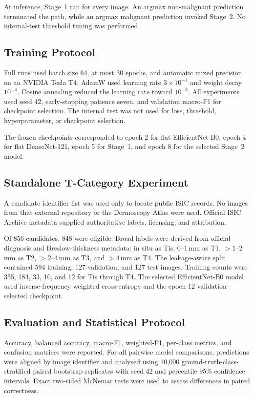 At inference, Stage~1 ran for every image. An argmax non-malignant prediction
terminated the path, while an argmax malignant prediction invoked Stage~2.
No internal-test threshold tuning was performed.

\subsection{Training Protocol}

Full runs used batch size 64, at most 30 epochs, and automatic mixed precision
on an NVIDIA Tesla T4. AdamW used learning rate $3\times10^{-4}$ and weight
decay $10^{-4}$. Cosine annealing reduced the learning rate toward
$10^{-6}$. All experiments used seed 42, early-stopping patience seven, and
validation macro-F1 for checkpoint selection. The internal test was not used
for loss, threshold, hyperparameter, or checkpoint selection.

The frozen checkpoints corresponded to epoch 2 for flat EfficientNet-B0,
epoch 4 for flat DenseNet-121, epoch 5 for Stage~1, and epoch 8 for the
selected Stage~2 model.

\subsection{Standalone T-Category Experiment}

A candidate identifier list was used only to locate public ISIC records. No
images from that external repository or the Dermoscopy Atlas were used.
Official ISIC Archive metadata supplied authoritative labels, licensing, and
attribution.

Of 856 candidates, 848 were eligible. Broad labels were derived from official
diagnosis and Breslow-thickness metadata: in situ as Tis,
$0$--$1$\,mm as T1, $>1$--$2$\,mm as T2,
$>2$--$4$\,mm as T3, and $>4$\,mm as T4. The leakage-aware split contained
594 training, 127 validation, and 127 test images. Training counts were
355, 184, 33, 10, and 12 for Tis through T4. The selected
EfficientNet-B0 model used inverse-frequency weighted cross-entropy and the
epoch-12 validation-selected checkpoint.

\subsection{Evaluation and Statistical Protocol}

Accuracy, balanced accuracy, macro-F1, weighted-F1, per-class metrics, and
confusion matrices were reported. For all pairwise model comparisons, predictions were aligned by image
identifier and analysed using 10,000 ground-truth-class-stratified paired
bootstrap replicates with seed 42 and percentile 95\% confidence intervals.
Exact two-sided McNemar tests were used to assess differences in paired
correctness.
